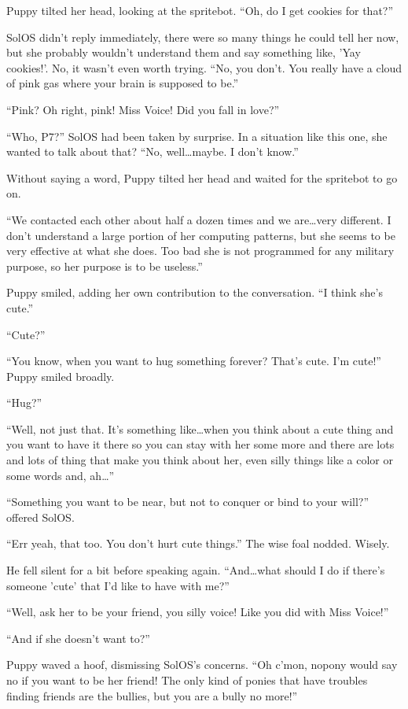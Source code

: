 Puppy tilted her head, looking at the spritebot. ``Oh, do I get cookies for that?''

SolOS didn't reply immediately, there were so many things he could tell her now, but she probably wouldn't understand them and say something like, 'Yay cookies!'. No, it wasn't even worth trying. ``No, you don't. You really have a cloud of pink gas where your brain is supposed to be.''

``Pink? Oh right, pink! Miss Voice! Did you fall in love?''

``Who, P7?'' SolOS had been taken by surprise. In a situation like this one, she wanted to talk about that? ``No, well\dots maybe. I don't know.''

Without saying a word, Puppy tilted her head and waited for the spritebot to go on.

``We contacted each other about half a dozen times and we are\dots very different. I don't understand a large portion of her computing patterns, but she seems to be very effective at what she does. Too bad she is not programmed for any military purpose, so her purpose is to be useless.''

Puppy smiled, adding her own contribution to the conversation. ``I think she's cute.''

``Cute?''

``You know, when you want to hug something forever? That's cute. I'm cute!'' Puppy smiled broadly.

``Hug?''

``Well, not just that. It's something like\dots when you think about a cute thing and you want to have it there so you can stay with her some more and there are lots and lots of thing that make you think about her, even silly things like a color or some words and, ah\dots''

``Something you want to be near, but not to conquer or bind to your will?'' offered SolOS.

``Err yeah, that too. You don't hurt cute things.'' The wise foal nodded. Wisely.

He fell silent for a bit before speaking again. ``And\dots what should I do if there's someone 'cute' that I'd like to have with me?''

``Well, ask her to be your friend, you silly voice! Like you did with Miss Voice!''

``And if she doesn't want to?''

Puppy waved a hoof, dismissing SolOS's concerns. ``Oh c'mon, nopony would say no if you want to be her friend! The only kind of ponies that have troubles finding friends are the bullies, but you are a bully no more!''

